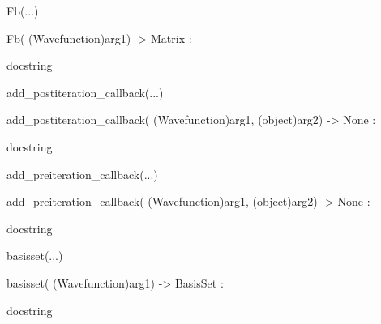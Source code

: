 \documentclass[letterpaper,10pt,english]{sphinxmanual}
\begin{document}
\begin{description}
\begin{description}
\begin{DUlineblock}{0em}
\begin{DUlineblock}{\DUlineblockindent}
\end{DUlineblock}
\item[] Fb(...)
\item[]
\begin{DUlineblock}{\DUlineblockindent}
\item[] Fb( (Wavefunction)arg1) -\textgreater{} Matrix :
\item[]
\begin{DUlineblock}{\DUlineblockindent}
\item[] docstring
\item[] 
\end{DUlineblock}
\end{DUlineblock}
\item[] add\_postiteration\_callback(...)
\item[]
\begin{DUlineblock}{\DUlineblockindent}
\item[] add\_postiteration\_callback( (Wavefunction)arg1, (object)arg2) -\textgreater{} None :
\item[]
\begin{DUlineblock}{\DUlineblockindent}
\item[] docstring
\item[] 
\end{DUlineblock}
\end{DUlineblock}
\item[] add\_preiteration\_callback(...)
\item[]
\begin{DUlineblock}{\DUlineblockindent}
\item[] add\_preiteration\_callback( (Wavefunction)arg1, (object)arg2) -\textgreater{} None :
\item[]
\begin{DUlineblock}{\DUlineblockindent}
\item[] docstring
\item[] 
\end{DUlineblock}
\end{DUlineblock}
\item[] basisset(...)
\item[]
\begin{DUlineblock}{\DUlineblockindent}
\item[] basisset( (Wavefunction)arg1) -\textgreater{} BasisSet :
\item[]
\begin{DUlineblock}{\DUlineblockindent}
\item[] docstring
\item[] 

\end{DUlineblock}
\end{DUlineblock}
\end{DUlineblock}
\end{description}
\end{description}
\end{document}
